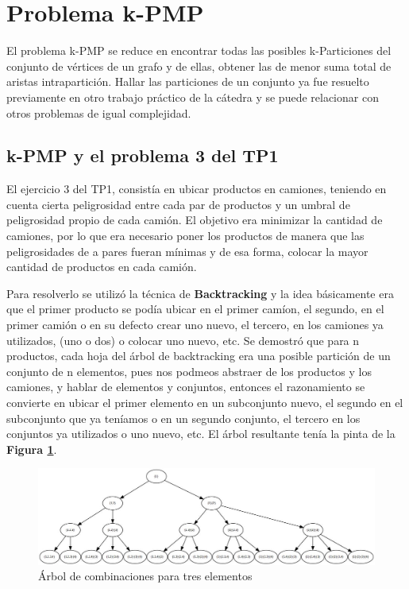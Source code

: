 \section{Problema k-PMP}

El problema k-PMP se reduce en encontrar todas las posibles k-Particiones del conjunto de v\'ertices de un grafo y de ellas, obtener las de menor suma total de aristas intrapartici\'on. Hallar las particiones de un conjunto ya fue resuelto previamente en otro trabajo pr\'actico de la c\'atedra y se puede relacionar con otros problemas de igual complejidad.

\subsection{k-PMP y el problema 3 del TP1}

El ejercicio 3 del TP1, consist\'ia en ubicar productos en camiones, teniendo en cuenta cierta peligrosidad entre cada par de productos y un umbral de peligrosidad propio de cada cami\'on. El objetivo era minimizar la cantidad de camiones, por lo que era necesario poner los productos de manera que las peligrosidades de a pares fueran m\'inimas y de esa forma, colocar la mayor cantidad de productos en cada cami\'on.

Para resolverlo se utiliz\'o la t\'ecnica de \textbf{Backtracking} y la idea b\'asicamente era que el primer producto se pod\'ia ubicar en el primer cam\'ion, el segundo, en el primer cami\'on o en su defecto crear uno nuevo, el tercero, en los camiones ya utilizados, (uno o dos) o colocar uno nuevo, etc. Se demostr\'o que para n productos, cada hoja del \'arbol de backtracking era una posible partici\'on de un conjunto de n elementos, pues nos podmeos abstraer de los productos y los camiones, y hablar de elementos y conjuntos, entonces el razonamiento se convierte en ubicar el primer elemento en un subconjunto nuevo, el segundo en el subconjunto que ya ten\'iamos o en un segundo conjunto, el tercero en los conjuntos ya utilizados o uno nuevo, etc. El \'arbol resultante ten\'ia la pinta de la \textbf{Figura \ref{combinaciones_4}}.

\begin{figure}[H]
	\begin{center}
		\includegraphics[scale=0.4]{ej1/combinaciones_4.jpg}
	\end{center}
	\caption{\'Arbol de combinaciones para tres elementos}
	\label{combinaciones_4}
\end{figure}

